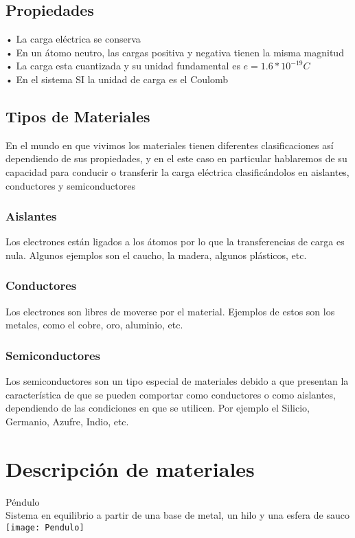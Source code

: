 \documentclass[14pt]{article}
\begin{document}
		\subsection{Propiedades}
		• La carga eléctrica se conserva \\
		• En un átomo neutro, las cargas 
		positiva y negativa tienen la misma
		magnitud \\
		• La carga esta cuantizada y su
		unidad fundamental es
		$e = 1.6*10^{-19}C$ \\
		• En el sistema SI la unidad de
		carga es el Coulomb \\
	\subsection{Tipos de Materiales}
	En el mundo en que vivimos los materiales tienen diferentes clasificaciones así dependiendo de sus propiedades, y en el este caso en particular hablaremos de su capacidad para conducir o transferir la carga eléctrica clasificándolos en aislantes, conductores y semiconductores 
	\subsubsection{Aislantes}
	Los electrones están ligados a los átomos por lo que la transferencias de carga es nula. Algunos ejemplos son el caucho, la madera, algunos plásticos, etc. 
	\subsubsection{Conductores}
	Los electrones son libres de moverse por el material. Ejemplos de estos son los metales, como el cobre, oro, aluminio, etc.
	\subsubsection{Semiconductores}
	Los semiconductores son un tipo especial de materiales debido a que
	presentan la característica de que se pueden comportar como conductores
	o como aislantes, dependiendo de las condiciones en que se utilicen. Por ejemplo el Silicio, Germanio, Azufre, Indio, etc. 

	\section{Descripción de materiales}
Péndulo\\
Sistema en equilibrio a partir de una base de metal, un hilo y una esfera de sauco
\texttt{[image: Pendulo]}
\end{document}
